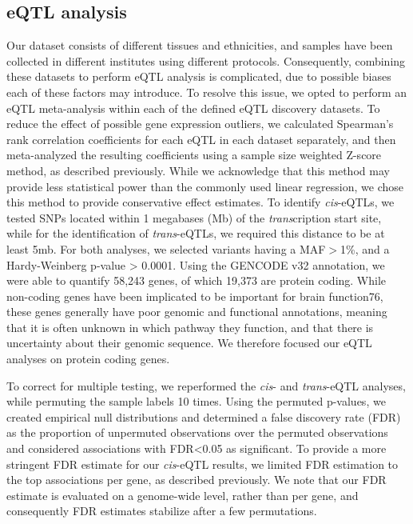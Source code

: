 \subsection{eQTL analysis}
Our dataset consists of different tissues and ethnicities, and samples have been collected in different institutes using different protocols. Consequently, combining these datasets to perform eQTL analysis is complicated, due to possible biases each of these factors may introduce. To resolve this issue, we opted to perform an eQTL meta-analysis within each of the defined eQTL discovery datasets. To reduce the effect of possible gene expression outliers, we calculated Spearman’s rank correlation coefficients for each eQTL in each dataset separately, and then meta-analyzed the resulting coefficients using a sample size weighted Z-score method, as described previously\cite{vosaUnravelingPolygenicArchitecture2018}. While we acknowledge that this method may provide less statistical power than the commonly used linear regression, we chose this method to provide conservative effect estimates. To identify \emph{cis}-eQTLs, we tested SNPs located within 1 megabases (Mb) of the \emph{trans}cription start site, while for the identification of \emph{trans}-eQTLs, we required this distance to be at least 5mb. For both analyses, we selected variants having a MAF$>$1\%, and a Hardy-Weinberg p-value > 0.0001. Using the GENCODE v32 annotation, we were able to quantify 58,243 genes, of which 19,373 are protein coding. While non-coding genes have been implicated to be important for brain function76, these genes generally have poor genomic and functional annotations, meaning that it is often unknown in which pathway they function, and that there is uncertainty about their genomic sequence. We therefore focused our eQTL analyses on protein coding genes. 

To correct for multiple testing, we reperformed the \emph{cis}- and \emph{trans}-eQTL analyses, while permuting the sample labels 10 times. Using the permuted p-values, we created empirical null distributions and determined a false discovery rate (FDR) as the proportion of unpermuted observations over the permuted observations and considered associations with FDR<0.05 as significant. To provide a more stringent FDR estimate for our \emph{cis}-eQTL results, we limited FDR estimation to the top associations per gene, as described previously\cite{vosaUnravelingPolygenicArchitecture2018}. We note that our FDR estimate is evaluated on a genome-wide level, rather than per gene, and consequently FDR estimates stabilize after a few permutations\cite{westraSystematicIdentificationTranseQTLs2013}. 

